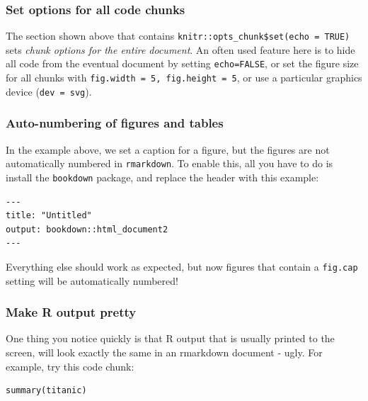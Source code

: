 \documentclass[]{book}
\begin{document}
\hypertarget{set-options-for-all-code-chunks}{%
\subsubsection*{Set options for all code chunks}\label{set-options-for-all-code-chunks}}

The section shown above that contains \texttt{knitr::opts\_chunk\$set(echo\ =\ TRUE)} sets \emph{chunk options for the entire document}. An often used feature here is to hide all code from the eventual document by setting \texttt{echo=FALSE}, or set the figure size for all chunks with \texttt{fig.width\ =\ 5,\ fig.height\ =\ 5}, or use a particular graphics device (\texttt{dev\ =\ \textquotesingle{}svg\textquotesingle{}}).

\hypertarget{auto-numbering-of-figures-and-tables}{%
\subsubsection*{Auto-numbering of figures and tables}\label{auto-numbering-of-figures-and-tables}}

In the example above, we set a caption for a figure, but the figures are not automatically numbered in \texttt{rmarkdown}. To enable this, all you have to do is install the \texttt{bookdown} package, and replace the header with this example:

\begin{verbatim}
---
title: "Untitled"
output: bookdown::html_document2
---
\end{verbatim}

Everything else should work as expected, but now figures that contain a \texttt{fig.cap} setting will be automatically numbered!

\hypertarget{make-r-output-pretty}{%
\subsubsection*{Make R output pretty}\label{make-r-output-pretty}}

One thing you notice quickly is that R output that is usually printed to the screen, will look exactly the same in an rmarkdown document - ugly. For example, try this code chunk:

\begin{verbatim}
summary(titanic) 
\end{verbatim}
\end{document}
